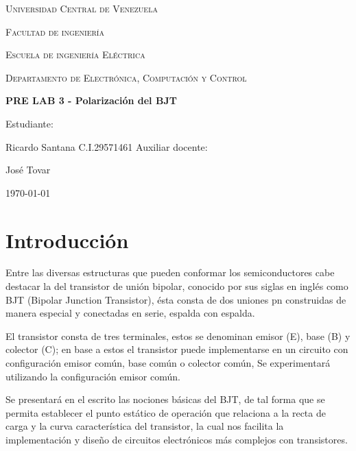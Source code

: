 \documentclass[10pt, a4paper]{article}
\begin{document}
    \begin{titlepage}
        \centering
        {\scshape\Large Universidad Central de Venezuela \par}
        {\scshape\Large Facultad de ingenier\'ia \par}
        {\scshape\Large Escuela de ingenier\'ia El\'ectrica \par}
        {\scshape\Large Departamento de Electr\'onica, Computaci\'on y Control \par}

        \vspace{6cm}
        {\Large\bfseries PRE LAB 3 - Polarización del BJT\par}
        \vspace{5cm}

        \vfill
        \begin{flushright}
            Estudiante:\par
            Ricardo Santana C.I.29571461
            \vspace{1cm}
            Auxiliar docente:\par
            José Tovar  
        \end{flushright}
        \vfill
        {\large \today\par}
    \end{titlepage}

    \begin{abstract}
        Aquí va el resumen del laboratorio
    \end{abstract}

    \newpage

    \section{Introducción}

    Entre las diversas estructuras que pueden conformar los semiconductores cabe destacar la del transistor de unión bipolar, conocido por sus siglas en inglés como BJT (Bipolar Junction Transistor), ésta consta de dos uniones pn construidas de manera especial y conectadas en serie, espalda con espalda.

    El transistor consta de tres terminales, estos se denominan emisor (E), base (B) y colector (C); en base a estos el transistor puede implementarse en un circuito con configuración emisor común, base común o colector común, Se experimentará utilizando la configuración emisor común.
    
    Se presentará en el escrito las nociones básicas del BJT, de tal forma que se permita establecer el punto estático de operación que relaciona a la recta de carga y la curva característica del transistor, la cual nos facilita la implementación y diseño de circuitos electrónicos más complejos con transistores.
\end{document}
